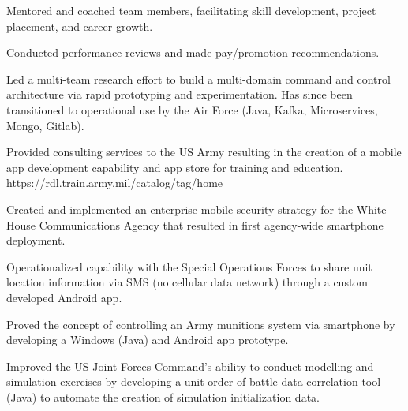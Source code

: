 \documentclass[]{deedy-resume-openfont}
\begin{document}
\sectionsep
{}\hfill {}
\begin{tightemize}
	\item Mentored and coached team members, facilitating skill development, project placement, and career growth.
	\item Conducted performance reviews and made pay/promotion recommendations.
\end{tightemize}
\sectionsep
{}\hfill {}
\begin{tightemize}
	\item Led a multi-team research effort to build a multi-domain command and control architecture via rapid prototyping and experimentation. Has since been transitioned to operational use by the Air Force (Java, Kafka, Microservices, Mongo, Gitlab).
	\item Provided consulting services to the US Army resulting in the creation of a mobile app development capability and app store for training and education.  https://rdl.train.army.mil/catalog/tag/home
\end{tightemize}
\sectionsep
{}\hfill {}
\begin{tightemize}
	\item Created and implemented an enterprise mobile security strategy for the White House Communications Agency that resulted in first agency-wide smartphone deployment.
	\item Operationalized capability with the Special Operations Forces to share unit location information via SMS (no cellular data network) through a custom developed Android app.
	\item Proved the concept of controlling an Army munitions system via smartphone by developing a Windows (Java) and Android app prototype.
\end{tightemize}
\sectionsep
{}\hfill {}
\begin{tightemize}
	\item Improved the US Joint Forces Command's ability to conduct modelling and simulation exercises by developing a unit order of battle data correlation tool (Java) to automate the creation of simulation initialization data.
\end{tightemize}
\sectionsep
\end{document}

